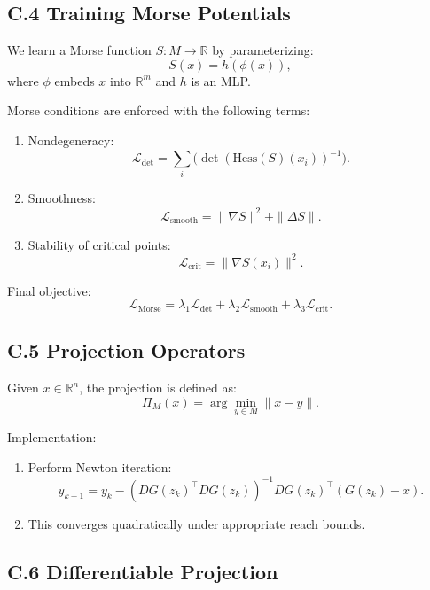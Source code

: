 \documentclass[11pt,a4paper,twocolumn]{article}
\begin{document}
\subsection*{C.4 Training Morse Potentials}

We learn a Morse function $S : M \to \mathbb{R}$ by parameterizing:
\[
S(x) = h(\phi(x)),
\]
where $\phi$ embeds $x$ into $\mathbb{R}^m$ and $h$ is an MLP.

Morse conditions are enforced with the following terms:

\begin{enumerate}
\item Nondegeneracy:
\[
\mathcal{L}_{\mathrm{det}} =
\sum_i \Big(\det(\mathrm{Hess}(S)(x_i))^{-1}\Big).
\]
\item Smoothness:
\[
\mathcal{L}_{\mathrm{smooth}} =
\|\nabla S\|^2 + \|\Delta S\|.
\]
\item Stability of critical points:
\[
\mathcal{L}_{\mathrm{crit}} =
\|\nabla S(x_i)\|^2.
\]
\end{enumerate}

Final objective:
\[
\mathcal{L}_{\mathrm{Morse}} =
\lambda_1 \mathcal{L}_{\mathrm{det}} +
\lambda_2 \mathcal{L}_{\mathrm{smooth}} +
\lambda_3 \mathcal{L}_{\mathrm{crit}}.
\]


\subsection*{C.5 Projection Operators}

Given $x \in \mathbb{R}^n$, the projection is defined as:
\[
\Pi_M(x) = \arg\min_{y \in M} \|x-y\|.
\]

Implementation:

\begin{enumerate}
\item Perform Newton iteration:
\[
y_{k+1} = y_k - (DG(z_k)^\top DG(z_k))^{-1}
DG(z_k)^\top (G(z_k) - x).
\]
\item This converges quadratically under appropriate reach bounds.
\end{enumerate}


\subsection*{C.6 Differentiable Projection}
\end{document}
